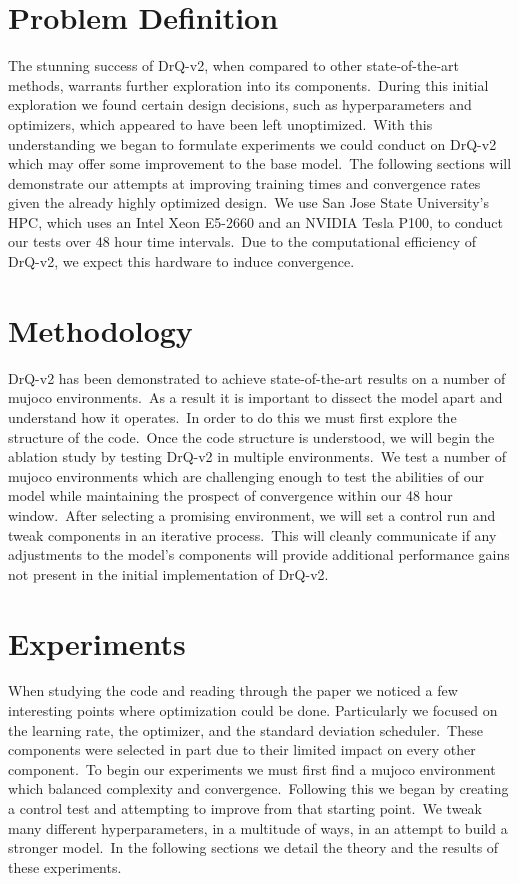 \documentclass[conference]{./IEEEtran/IEEEtran} %
\begin{document}
    \section{Problem Definition}\label{sec:problem-definition}

    The stunning success of DrQ-v2, when compared to other state-of-the-art methods, warrants further exploration into its
    components.\ During this initial exploration we found certain design decisions, such as hyperparameters and optimizers, which
    appeared to have been left unoptimized.\ With this understanding we began to formulate experiments we could conduct on DrQ-v2
    which may offer some improvement to the base model.\ The following sections will demonstrate our attempts at improving
    training times and convergence rates given the already highly optimized design.\ We use San Jose State University’s HPC,
    which uses an Intel Xeon E5-2660 and an NVIDIA Tesla P100, to conduct our tests over 48 hour time intervals.\ Due to the
    computational efficiency of DrQ-v2, we expect this hardware to induce convergence.\

    \section{Methodology}\label{sec:methodology}

    DrQ-v2 has been demonstrated to achieve state-of-the-art results on a number of mujoco environments.\ As a result it is
    important to dissect the model apart and understand how it operates.\ In order to do this we must first explore the structure
    of the code.\ Once the code structure is understood, we will begin the ablation study by testing DrQ-v2 in multiple
    environments.\ We test a number of mujoco environments which are challenging enough to test the abilities of our model while
    maintaining the prospect of convergence within our 48 hour window.\ After selecting a promising environment, we will set a
    control run and tweak components in an iterative process.\ This will cleanly communicate if any adjustments to the model's
    components will provide additional performance gains not present in the initial implementation of DrQ-v2.\

    \section{Experiments}\label{sec:experiments}

    When studying the code and reading through the paper we noticed a few interesting points where optimization could be done.
    Particularly we focused on the learning rate, the optimizer, and the standard deviation scheduler.\ These components were
    selected in part due to their limited impact on every other component.\ To begin our experiments we must first find a mujoco
    environment which balanced complexity and convergence.\ Following this we began by creating a control test and attempting to
    improve from that starting point.\ We tweak many different hyperparameters, in a multitude of ways, in an attempt to build a
    stronger model.\ In the following sections we detail the theory and the results of these experiments.\
\end{document}
